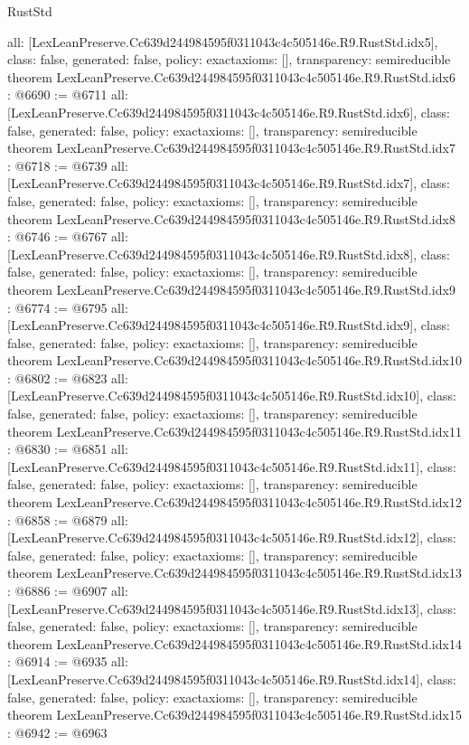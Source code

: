\begin{lexlean}{RustStd}
\begin{coremodule}
{  all: [LexLeanPreserve.Cc639d244984595f0311043c4c505146e.R9.RustStd.idx5],
  class: false,
  generated: false,
  policy: exact{axioms: []},
  transparency: semireducible
}
theorem LexLeanPreserve.Cc639d244984595f0311043c4c505146e.R9.RustStd.idx6 : @6690 := @6711 {
  all: [LexLeanPreserve.Cc639d244984595f0311043c4c505146e.R9.RustStd.idx6],
  class: false,
  generated: false,
  policy: exact{axioms: []},
  transparency: semireducible
}
theorem LexLeanPreserve.Cc639d244984595f0311043c4c505146e.R9.RustStd.idx7 : @6718 := @6739 {
  all: [LexLeanPreserve.Cc639d244984595f0311043c4c505146e.R9.RustStd.idx7],
  class: false,
  generated: false,
  policy: exact{axioms: []},
  transparency: semireducible
}
theorem LexLeanPreserve.Cc639d244984595f0311043c4c505146e.R9.RustStd.idx8 : @6746 := @6767 {
  all: [LexLeanPreserve.Cc639d244984595f0311043c4c505146e.R9.RustStd.idx8],
  class: false,
  generated: false,
  policy: exact{axioms: []},
  transparency: semireducible
}
theorem LexLeanPreserve.Cc639d244984595f0311043c4c505146e.R9.RustStd.idx9 : @6774 := @6795 {
  all: [LexLeanPreserve.Cc639d244984595f0311043c4c505146e.R9.RustStd.idx9],
  class: false,
  generated: false,
  policy: exact{axioms: []},
  transparency: semireducible
}
theorem LexLeanPreserve.Cc639d244984595f0311043c4c505146e.R9.RustStd.idx10 : @6802 := @6823 {
  all: [LexLeanPreserve.Cc639d244984595f0311043c4c505146e.R9.RustStd.idx10],
  class: false,
  generated: false,
  policy: exact{axioms: []},
  transparency: semireducible
}
theorem LexLeanPreserve.Cc639d244984595f0311043c4c505146e.R9.RustStd.idx11 : @6830 := @6851 {
  all: [LexLeanPreserve.Cc639d244984595f0311043c4c505146e.R9.RustStd.idx11],
  class: false,
  generated: false,
  policy: exact{axioms: []},
  transparency: semireducible
}
theorem LexLeanPreserve.Cc639d244984595f0311043c4c505146e.R9.RustStd.idx12 : @6858 := @6879 {
  all: [LexLeanPreserve.Cc639d244984595f0311043c4c505146e.R9.RustStd.idx12],
  class: false,
  generated: false,
  policy: exact{axioms: []},
  transparency: semireducible
}
theorem LexLeanPreserve.Cc639d244984595f0311043c4c505146e.R9.RustStd.idx13 : @6886 := @6907 {
  all: [LexLeanPreserve.Cc639d244984595f0311043c4c505146e.R9.RustStd.idx13],
  class: false,
  generated: false,
  policy: exact{axioms: []},
  transparency: semireducible
}
theorem LexLeanPreserve.Cc639d244984595f0311043c4c505146e.R9.RustStd.idx14 : @6914 := @6935 {
  all: [LexLeanPreserve.Cc639d244984595f0311043c4c505146e.R9.RustStd.idx14],
  class: false,
  generated: false,
  policy: exact{axioms: []},
  transparency: semireducible
}
theorem LexLeanPreserve.Cc639d244984595f0311043c4c505146e.R9.RustStd.idx15 : @6942 := @6963 {
}
\end{coremodule}
\end{lexlean}
